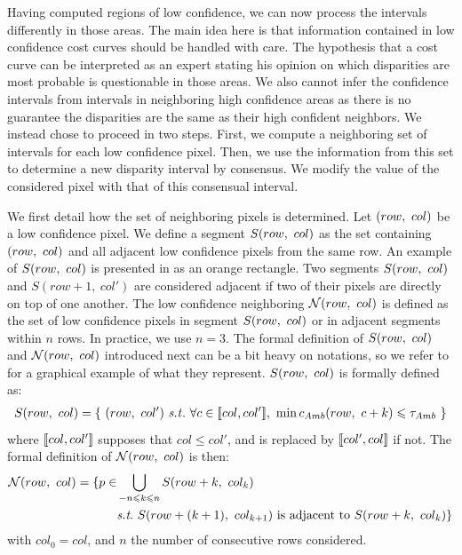 Having computed regions of low confidence, we can now process the intervals differently in those areas. The main idea here is that information contained in low confidence cost curves should be handled with care. The hypothesis that a cost curve can be interpreted as an expert stating his opinion on which disparities are most probable is questionable in those areas. We also cannot infer the confidence intervals from intervals in neighboring high confidence areas as there is no guarantee the disparities are the same as their high confident neighbors. We instead chose to proceed in two steps. First, we compute a neighboring set of intervals for each low confidence pixel. Then, we use the information from this set to determine a new disparity interval by consensus. We modify the value of the considered pixel with that of this consensual interval.

We first detail how the set of neighboring pixels is determined. Let $(row, ~col)$ be a low confidence pixel. We define a segment $S(row, ~col)$ as the set containing $(row, ~col)$ and all adjacent low confidence pixels from the same row. An example of $S(row, ~col)$ is presented in  as an orange rectangle. Two segments $S(row, ~col)$ and $S(row+1, ~col')$ are considered adjacent if two of their pixels are directly on top of one another. The low confidence neighboring $\mathcal{N}(row,~col)$ is defined as the set of low confidence pixels in segment $S(row, ~col)$ or in adjacent segments within $n$ rows. In practice, we use $n=3$. The formal definition of $S(row, ~col)$ and $\mathcal{N}(row,~col)$ introduced next can be a bit heavy on notations, so we refer to  for a graphical example of what they represent. $S(row, ~col)$ is formally defined as:
\begin{align}
    S(\rowcol) = \{~ (row,~col') \text{ \st }~\forall c\in\opi col, col'\cli,~\min c_{Amb}(row, ~c+k)\leqslant \tau_{Amb}~\}
\end{align}
where $[\![ col, col']\!]$ supposes that $col\leqslant col'$, and is replaced by $[\![ col', col]\!]$ if not. The formal definition of $\mathcal{N}(row,~col)$ is then:
\begin{align}
    \N(row,~col) = \{ p\in &\bigcup_{-n\leqslant k\leqslant n}S(row+k, ~col_k)\nonumber\\
    &\st~S(row + (k+1), ~col_{k+1})\text{ is adjacent to }S(row+k, ~col_{k})\}
\end{align}
with $col_0=col$, and $n$ the number of consecutive rows considered.

